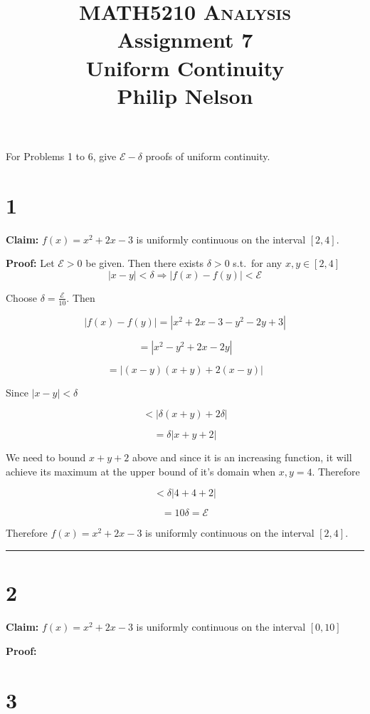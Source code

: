 \documentclass[10pt,letterpaper]{article}
\newcommand\E{\mathcal{E}}
\newcommand\qedsym{\hfill \rule{2mm}{2mm}}
\begin{document}
\title{MATH5210 \textsc{Analysis}
  \\ Assignment 7
  \\ Uniform Continuity
  \\ Philip Nelson
}

\date{}

\maketitle
For Problems 1 to 6, give $\E - \delta$ proofs of uniform continuity.
\section*{1}

\textbf{Claim:} $f(x) = x^2 + 2x -3$ is uniformly continuous on the interval $[2,4]$.

\medskip

\textbf{Proof:} Let $\E > 0$ be given. Then there exists $\delta > 0$ s.t.\ for any $x, y \in [2,4]$ \[|x-y| < \delta \Rightarrow |f(x) - f(y)| < \E\]

Choose $\delta = \frac{\E}{10}$. Then

\[|f(x)-f(y)| = |x^2 + 2x - 3 - y^2 - 2y + 3|\]

\[= |x^2 - y^2 + 2x - 2y|\]

\[= |(x-y)(x+y) + 2(x-y)|\]

Since $|x-y| < \delta$

\[< |\delta(x+y) + 2\delta|\]

\[= \delta|x + y + 2|\]

We need to bound $x + y + 2$ above and since it is an increasing function, it will achieve its maximum at the upper bound of it's domain when $x,y = 4$. Therefore

\[<\delta|4+4+2|\]

\[=10\delta = \E\]

Therefore $f(x) = x^2 + 2x -3$ is uniformly continuous on the interval $[2,4]$.

\qedsym

\section*{2}

\textbf{Claim:} $f(x) = x^2 + 2x -3$ is uniformly continuous on the interval $[0,10]$

\medskip

\textbf{Proof:}

\section*{3}
\end{document}

